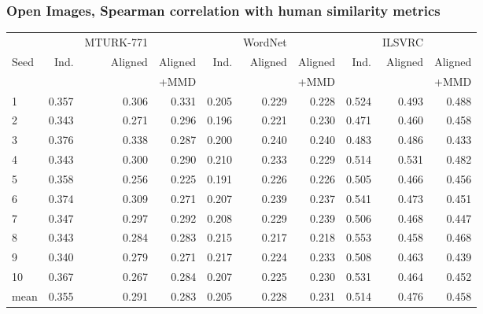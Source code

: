 \subsubsection{Open Images, Spearman correlation with human similarity metrics}
\begin{table}[H]
\centering
\begin{tabular}{lrrrrrrrrr}
  \toprule
   &     &   MTURK-771        &               &      &    WordNet       &               &     &  ILSVRC           & \\
{Seed} &  Ind. &   Aligned &  Aligned  & Ind. &   Aligned &  Aligned  & Ind. &   Aligned &  Aligned   \\
{}     &              &           & +MMD      &            &            & +MMD      &             &           &   +MMD \\
\midrule
1    &     0.357 &  0.306 &   0.331 &     0.205 &  0.229 &    0.228 &   0.524 &  0.493 &  0.488  \\
2    &     0.343 &  0.271 &   0.296 &     0.196 &  0.221 &    0.230 &   0.471 &  0.460 &  0.458  \\
3    &     0.376 &  0.338 &   0.287 &     0.200 &  0.240 &    0.240 &   0.483 &  0.486 &  0.433  \\
4    &     0.343 &  0.300 &   0.290 &     0.210 &  0.233 &    0.229 &   0.514 &  0.531 &  0.482 \\
5    &     0.358 &  0.256 &   0.225 &     0.191 &  0.226 &    0.226 &   0.505 &  0.466 &  0.456  \\
6    &     0.374 &  0.309 &   0.271 &     0.207 &  0.239 &    0.237 &   0.541 &  0.473 &  0.451  \\
7    &     0.347 &  0.297 &   0.292 &     0.208 &  0.229 &    0.239 &   0.506 &  0.468 &  0.447  \\
8    &     0.343 &  0.284 &   0.283 &     0.215 &  0.217 &    0.218 &   0.553 &  0.458 &  0.468  \\
9    &     0.340 &  0.279 &   0.271 &     0.217 &  0.224 &    0.233 &   0.508 &  0.463 &  0.439  \\
10   &     0.367 &  0.267 &   0.284 &     0.207 &  0.225 &    0.230 &   0.531 &  0.464 &  0.452  \\
\midrule                                                                                         
mean &     0.355 &  0.291 &   0.283 &     0.205 &  0.228 &    0.231 &   0.514 &  0.476 &  0.458  \\
\bottomrule
\end{tabular}
\end{table}

